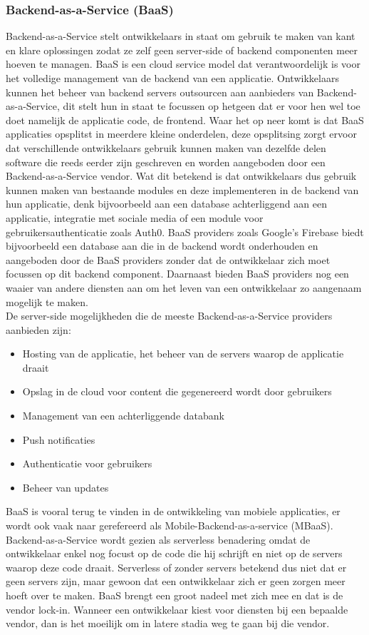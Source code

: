 \subsubsection{Backend-as-a-Service (BaaS)}
Backend-as-a-Service stelt ontwikkelaars in staat om gebruik te maken van kant en klare oplossingen zodat ze zelf geen server-side of backend componenten meer hoeven te managen. BaaS is een cloud service model dat verantwoordelijk is voor het volledige management van  de backend van een applicatie. Ontwikkelaars kunnen het beheer van backend servers outsourcen aan aanbieders van Backend-as-a-Service, dit stelt hun in staat te focussen op hetgeen dat er voor hen wel toe doet namelijk de applicatie code, de frontend. Waar het op neer komt is dat BaaS applicaties opsplitst in meerdere kleine onderdelen, deze opsplitsing zorgt ervoor dat verschillende ontwikkelaars gebruik kunnen maken van dezelfde delen software die reeds eerder zijn geschreven en worden aangeboden door een Backend-as-a-Service vendor. Wat dit betekend is dat ontwikkelaars dus gebruik kunnen maken van bestaande modules en deze implementeren in de backend van hun applicatie, denk bijvoorbeeld aan een database achterliggend aan een applicatie, integratie met sociale media of een module voor gebruikersauthenticatie zoals Auth0. BaaS providers zoals Google's Firebase biedt bijvoorbeeld een database aan die in de backend wordt onderhouden en aangeboden door de BaaS providers zonder dat de ontwikkelaar zich moet focussen op dit backend component. Daarnaast bieden BaaS providers nog een waaier van andere diensten aan om het leven van een ontwikkelaar zo aangenaam mogelijk te maken.
\\
De server-side mogelijkheden die de meeste Backend-as-a-Service providers aanbieden zijn:
\begin{itemize}
    \item Hosting van de applicatie, het beheer van de servers waarop de applicatie draait
    \item Opslag in de cloud voor content die gegenereerd wordt door gebruikers
    \item Management van een achterliggende databank
    \item Push notificaties
    \item Authenticatie voor gebruikers
    \item Beheer van updates
\end{itemize}
BaaS is vooral terug te vinden in de ontwikkeling van mobiele applicaties, er wordt ook vaak naar gerefereerd als Mobile-Backend-as-a-service (MBaaS). Backend-as-a-Service wordt gezien als serverless benadering omdat de ontwikkelaar enkel nog focust op de code die hij schrijft en niet op de servers waarop deze code draait. Serverless of zonder servers betekend dus niet dat er geen servers zijn, maar gewoon dat een ontwikkelaar zich er geen zorgen meer hoeft over te maken. BaaS brengt een groot nadeel met zich mee en dat is de vendor lock-in. Wanneer een ontwikkelaar kiest voor diensten bij een bepaalde vendor, dan is het moeilijk om in latere stadia weg te gaan bij die vendor.\autocite{Cloudflare2019} 


